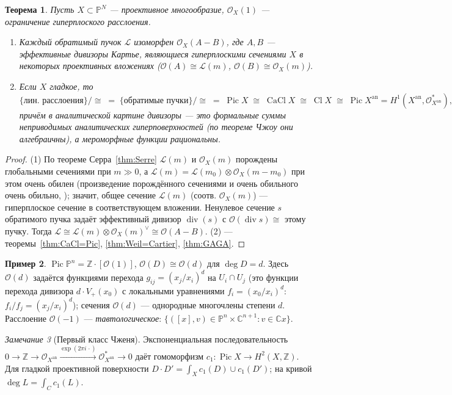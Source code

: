\documentclass[11pt,a4paper]{article}
\theoremstyle{plain}
\newtheorem{theorem}{Теорема}[section]
\theoremstyle{definition}
\newtheorem{example}[theorem]{Пример}
\theoremstyle{remark}
\newtheorem{remark}[theorem]{Замечание}
\renewcommand{\C}{\mathbb{C}}
\newcommand{\Z}{\mathbb{Z}}
\newcommand{\PP}{\mathbb{P}}
\newcommand{\cO}{\mathcal{O}}
\newcommand{\cL}{\mathcal{L}}
\DeclareMathOperator{\Pic}{Pic}
\DeclareMathOperator{\Cl}{Cl}
\DeclareMathOperator{\CaCl}{CaCl}
\DeclareMathOperator{\divv}{div}
\newcommand{\an}{\mathrm{an}}
\begin{document}
\begin{theorem}\label{thm:proj-div}
Пусть $X\subset\PP^N$ --- проективное многообразие, $\cO_X(1)$ --- ограничение гиперплоского
расслоения.
\begin{enumerate}
\item Каждый обратимый пучок $\cL$ изоморфен $\cO_X(A-B)$, где $A,B$ --- эффективные дивизоры
Картье, являющиеся гиперплоскими сечениями $X$ в некоторых проективных вложениях
($\cO(A)\cong\cL(m)$, $\cO(B)\cong\cO_X(m)$).
\item Если $X$ гладкое, то
\[
\{\text{лин. расслоения}\}/{\cong}\;=\;\{\text{обратимые пучки}\}/{\cong}\;=\;\Pic X\;\cong\;
\CaCl X\;\cong\;\Cl X\;\cong\;\Pic X^{\an}=H^1(X^{\an},\cO_{X^\an}^*),
\]
причём в аналитической картине дивизоры --- это формальные суммы неприводимых аналитических
гиперповерхностей (по теореме Чжоу они алгебраичны), а мероморфные функции рациональны.
\end{enumerate}
\end{theorem}
\begin{proof}
(1) По теореме Серра~\ref{thm:Serre} $\cL(m)$ и $\cO_X(m)$ порождены глобальными сечениями при
$m\gg0$, а $\cL(m)=\cL(m_0)\otimes\cO_X(m-m_0)$ при этом очень обилен (произведение порождённого сечениями и
очень обильного очень обильно, \cite[II.7.10, II.7.5]{Ha}); значит, общее сечение $\cL(m)$ (соотв.
$\cO_X(m)$) --- гиперплоское сечение в соответствующем вложении. Ненулевое сечение $s$ обратимого пучка задаёт эффективный дивизор $\divv(s)$ с
$\cO(\divv s)\cong$ этому пучку. Тогда $\cL\cong\cL(m)\otimes\cO_X(m)^\vee\cong\cO(A-B)$.
(2) --- теоремы~\ref{thm:CaCl=Pic}, \ref{thm:Weil=Cartier}, \ref{thm:GAGA}.
\end{proof}

\begin{example}
$\Pic\PP^n=\Z\cdot[\cO(1)]$, $\cO(D)\cong\cO(d)$ для $\deg D=d$. Здесь $\cO(d)$ задаётся
функциями перехода $g_{ij}=(x_j/x_i)^{d}$ на $U_i\cap U_j$ (это функции перехода дивизора
$d\cdot V_+(x_0)$ с локальными уравнениями $f_i=(x_0/x_i)^d$: $f_i/f_j=(x_j/x_i)^d$);
сечения $\cO(d)$ --- однородные многочлены степени $d$. Расслоение $\cO(-1)$ ---
\emph{тавтологическое}: $\{([x],v)\in\PP^n\times\C^{n+1}: v\in\C x\}$.
\end{example}

\begin{remark}[Первый класс Чженя]
Экспоненциальная последовательность $0\to\Z\to\cO_{X^\an}\xrightarrow{\exp(2\pi i\,\cdot)}
\cO^*_{X^\an}\to0$ даёт гомоморфизм $c_1\colon\Pic X\to H^2(X,\Z)$. Для гладкой проективной
поверхности $D\cdot D'=\int_X c_1(D)\cup c_1(D')$; на кривой $\deg L=\int_C c_1(L)$.
\end{remark}
\end{document}
